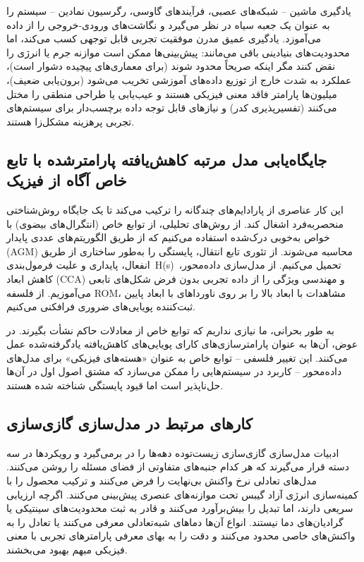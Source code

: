 \documentclass[12pt, a4paper]{article}
\begin{document}
یادگیری ماشین – شبکه‌های عصبی، فرآیندهای گاوسی، رگرسیون نمادین – سیستم را به عنوان یک جعبه سیاه در نظر می‌گیرد و نگاشت‌های ورودی-خروجی را از داده می‌آموزد. یادگیری عمیق مدرن موفقیت تجربی قابل توجهی کسب می‌کند، اما محدودیت‌های بنیادینی باقی می‌مانند: پیش‌بینی‌ها ممکن است موازنه جرم یا انرژی را نقض کنند مگر اینکه صریحاً محدود شوند (برای معماری‌های پیچیده دشوار است)، عملکرد به شدت خارج از توزیع داده‌های آموزشی تخریب می‌شود (برون‌یابی ضعیف)، میلیون‌ها پارامتر فاقد معنی فیزیکی هستند و عیب‌یابی یا طراحی منطقی را مختل می‌کنند (تفسیرپذیری کدر) و نیازهای قابل توجه داده برچسب‌دار برای سیستم‌های تجربی پرهزینه مشکل‌زا هستند.

\subsection{جایگاه‌یابی مدل مرتبه کاهش‌یافته پارامترشده با تابع خاص آگاه از فیزیک}

این کار عناصری از پارادایم‌های چندگانه را ترکیب می‌کند تا یک جایگاه روش‌شناختی منحصربه‌فرد اشغال کند. از روش‌های تحلیلی، از توابع خاص (انتگرال‌های بیضوی) با خواص به‌خوبی درک‌شده استفاده می‌کنیم که از طریق الگوریتم‌های عددی پایدار (AGM) محاسبه می‌شوند. از تئوری تابع انتقال، پایستگی را به‌طور ساختاری از طریق انفعال، پایداری و علیت فرمول‌بندی H(s) تحمیل می‌کنیم. از مدل‌سازی داده‌محور، کاهش ابعاد (CCA) و مهندسی ویژگی را از داده تجربی بدون فرض شکل‌های تابعی می‌آموزیم. از فلسفه ROM، مشاهدات با ابعاد بالا را بر روی ناورداهای با ابعاد پایین ثبت‌کننده پویایی‌های ضروری فرافکنی می‌کنیم.

به طور بحرانی، ما نیازی نداریم که توابع خاص از معادلات حاکم نشأت بگیرند. در عوض، آن‌ها به عنوان پارامترسازی‌های کارای پویایی‌های کاهش‌یافته یادگرفته‌شده عمل می‌کنند. این تغییر فلسفی – توابع خاص به عنوان «هسته‌های فیزیکی» برای مدل‌های داده‌محور – کاربرد در سیستم‌هایی را ممکن می‌سازد که مشتق اصول اول در آن‌ها حل‌ناپذیر است اما قیود پایستگی شناخته شده هستند.

\subsection{کارهای مرتبط در مدل‌سازی گازی‌سازی}

ادبیات مدل‌سازی گازی‌سازی زیست‌توده دهه‌ها را در برمی‌گیرد و رویکردها در سه دسته قرار می‌گیرند که هر کدام جنبه‌های متفاوتی از فضای مسئله را روشن می‌کنند. مدل‌های تعادلی نرخ واکنش بی‌نهایت را فرض می‌کنند و ترکیب محصول را با کمینه‌سازی انرژی آزاد گیبس تحت موازنه‌های عنصری پیش‌بینی می‌کنند. اگرچه ارزیابی سریعی دارند، اما تبدیل را بیش‌برآورد می‌کنند و قادر به ثبت محدودیت‌های سینتیکی یا گرادیان‌های دما نیستند. انواع آن‌ها دماهای شبه‌تعادلی معرفی می‌کنند یا تعادل را به واکنش‌های خاصی محدود می‌کنند و دقت را به بهای معرفی پارامترهای تجربی با معنی فیزیکی مبهم بهبود می‌بخشند.
\end{document}
